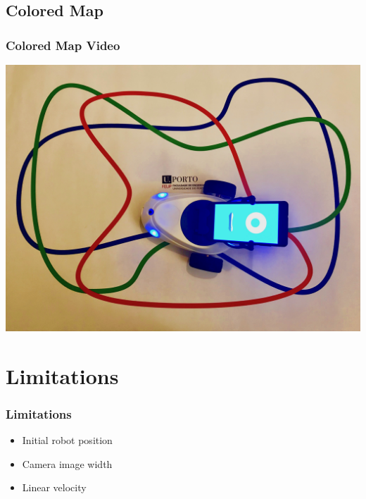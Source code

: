 \documentclass{beamer}
\begin{document}

\subsection{Colored Map} 
\begin{frame}
\frametitle{Colored Map Video}
\begin{center}
\href{run:video/robobo_line_follower.mp4}{\includegraphics[scale=0.06]{img/map_color_robobo.jpg}}
\end{center}
\end{frame}


\section{Limitations}
\begin{frame}
\frametitle{Limitations}
\begin{itemize}[<+->]
	\item Initial robot position
    \item Camera image width
    \item Linear velocity
\end{itemize}
\end{frame}

\end{document}

